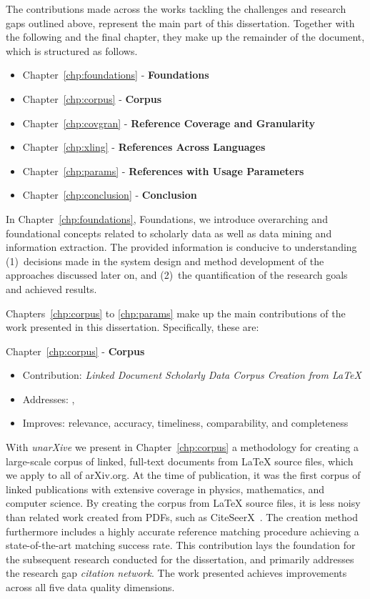 The contributions made across the works tackling the challenges and research gaps outlined above, represent the main part of this dissertation. Together with the following and the final chapter, they make up the remainder of the document, which is structured as follows.

\begin{itemize}
    \item Chapter~\ref{chp:foundations} - \textbf{Foundations}
    \item Chapter~\ref{chp:corpus} - \textbf{Corpus}
    \item Chapter~\ref{chp:covgran} - \textbf{Reference Coverage and Granularity}
    \item Chapter~\ref{chp:xling} - \textbf{References Across Languages}
    \item Chapter~\ref{chp:params} - \textbf{References with Usage Parameters}
    \item Chapter~\ref{chp:conclusion} - \textbf{Conclusion}
\end{itemize}


In Chapter~\ref{chp:foundations}, Foundations, we introduce overarching and foundational concepts related to scholarly data as well as data mining and information extraction. The provided information is conducive to understanding (1)~decisions made in the system design and method development of the approaches discussed later on, and (2)~the quantification of the research goals and achieved results.

Chapters~\ref{chp:corpus} to \ref{chp:params} make up the main contributions of the work presented in this dissertation. Specifically, these are:

Chapter~\ref{chp:corpus} - \textbf{Corpus}
\begin{itemize}
    \setlength\itemsep{-0.5em}
    \item Contribution: \textit{Linked Document Scholarly Data Corpus Creation from \LaTeX{}}
    \item Addresses: , 
    \item Improves: relevance, accuracy, timeliness, comparability, and completeness
\end{itemize}
With \emph{unarXive} we present in Chapter~\ref{chp:corpus} a methodology for creating a large-scale corpus of linked, full-text documents from \LaTeX{} source files, which we apply to all of arXiv.org. At the time of publication, it was the first corpus of linked publications with extensive coverage in physics, mathematics, and computer science. By creating the corpus from \LaTeX{} source files, it is less noisy than related work created from PDFs, such as CiteSeerX~\cite{Wu2015}. The creation method furthermore includes a highly accurate reference matching procedure achieving a state-of-the-art matching success rate.
This contribution lays the foundation for the subsequent research conducted for the dissertation, and primarily addresses the research gap \emph{citation network}.
The work presented achieves improvements across all five data quality dimensions.

